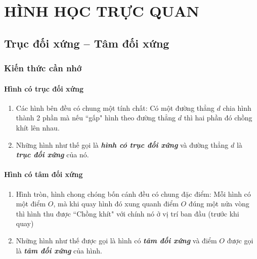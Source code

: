 \def\i{\item}
\graphicspath{{../pictures/vande36/}}
\chapter{HÌNH HỌC TRỰC QUAN}
\section{Trục đối xứng – Tâm đối xứng}
\subsection{Kiến thức cần nhớ} 
\subsubsection{Hình có trục đối xứng}
\begin{enumerate}[--, leftmargin=*]
	\i Các hình bên đều có chung một tính chất: Có một đường thẳng $d$ chia hình thành 2 phần mà nếu ``gấp" hình theo đường thẳng $d$ thì hai phần đó chồng khít lên nhau.
	\i Những hình như thế gọi là \textbf{\textit{hình có trục đối xứng}} và đường thẳng $d$ là \textbf{\textit{trục đối xứng}} của nó.
\end{enumerate}
\subsubsection{Hình có tâm đối xứng}
\begin{enumerate}[--, leftmargin=*]
	\i Hình tròn, hình chong chóng bốn cánh đều có chung đặc điểm: Mỗi hình có một điểm $O$, mà khi quay hình đó xung quanh điểm $O$ đúng một nửa vòng thì hình thu được ``Chồng khít" với chính nó ở vị trí ban đầu (trước khi quay)
	\i Những hình như thế được gọi là hình có \textbf{\textit{tâm đối xứng}} và điểm $O$ được gọi là \textbf{\textit{tâm đối xứng}} của hình. 
\end{enumerate}
